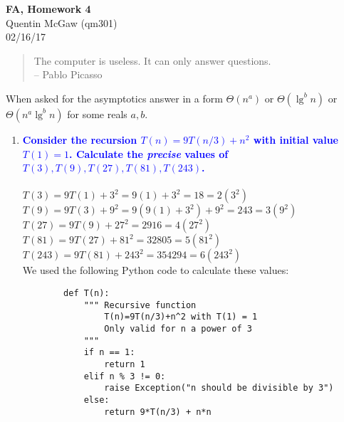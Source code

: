 \documentclass[11pt]{article}
\begin{document}
\begin{center} {\Large\bf FA, Homework 4}  \\ Quentin McGaw (qm301) \\ 02/16/17

\end{center}

\begin{quote}
The computer is useless. It can only answer questions.  \\ -- Pablo Picasso
\end{quote}

When asked for the asymptotics answer in a form $\Theta(n^a)$ or
$\Theta(\lg^bn)$ or $\Theta(n^a\lg^bn)$ for some reals $a,b$.

\begin{enumerate}
\item  \textbf{\textcolor{blue}{Consider the recursion $T(n)=9T(n/3) + n^2$ 
with initial value $T(1)=1$. Calculate the {\em precise} values of 
$T(3),T(9),T(27),T(81),T(243)$.}}
        \\\\ $T(3) = 9T(1) + 3^2 = 9(1) + 3^2 = 18 = 2(3^2)$
        \\ $T(9) = 9T(3) + 9^2 = 9(9(1) + 3^2) + 9^2 = 243 = 3(9^2)$
        \\ $T(27) = 9T(9) + 27^2 = 2916 = 4(27^2)$
        \\ $T(81) = 9T(27) + 81^2 = 32805 = 5(81^2)$
        \\ $T(243) = 9T(81) + 243^2 = 354294 = 6(243^2)$
        \\ We used the following Python code to calculate these values:
        \begin{verbatim}
        def T(n):
            """ Recursive function 
                T(n)=9T(n/3)+n^2 with T(1) = 1
                Only valid for n a power of 3
            """
            if n == 1:
                return 1
            elif n % 3 != 0:
                raise Exception("n should be divisible by 3")
            else:
                return 9*T(n/3) + n*n
        

\end{verbatim}
\end{enumerate}
\end{document}
